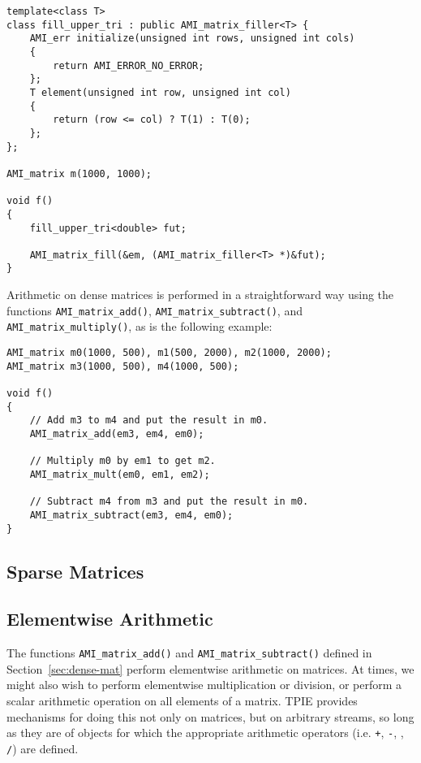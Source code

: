 \begin{verbatim}
template<class T>
class fill_upper_tri : public AMI_matrix_filler<T> {
    AMI_err initialize(unsigned int rows, unsigned int cols)
    {
        return AMI_ERROR_NO_ERROR;
    };
    T element(unsigned int row, unsigned int col)
    {
        return (row <= col) ? T(1) : T(0);
    };
};

AMI_matrix m(1000, 1000);

void f()
{
    fill_upper_tri<double> fut;

    AMI_matrix_fill(&em, (AMI_matrix_filler<T> *)&fut);
}
\end{verbatim}

Arithmetic on dense matrices is performed in a straightforward way
using the functions \verb|AMI_matrix_add()|,
\verb|AMI_matrix_subtract()|, and \verb|AMI_matrix_multiply()|, as is
the following example:

\begin{verbatim}
AMI_matrix m0(1000, 500), m1(500, 2000), m2(1000, 2000);
AMI_matrix m3(1000, 500), m4(1000, 500);

void f()
{
    // Add m3 to m4 and put the result in m0.
    AMI_matrix_add(em3, em4, em0);
   
    // Multiply m0 by em1 to get m2.
    AMI_matrix_mult(em0, em1, em2);

    // Subtract m4 from m3 and put the result in m0.
    AMI_matrix_subtract(em3, em4, em0);        
}
\end{verbatim}


\subsection{Sparse Matrices}
\label{sec:sparse-mat}


\subsection{Elementwise Arithmetic}
\label{sec:elementwise}

The functions \verb|AMI_matrix_add()|
and \verb|AMI_matrix_subtract()| defined in
Section~\ref{sec:dense-mat} perform elementwise arithmetic on
matrices.  At times, we might also wish to perform elementwise
multiplication or division, or perform a scalar arithmetic operation
on all elements of a matrix.  TPIE provides mechanisms for doing this
not only on matrices, but on arbitrary streams, so long as they are of
objects for which the appropriate arithmetic operators (i.e. {\tt +},
{\tt -}, {\tt *}, {\tt /}) are defined.

